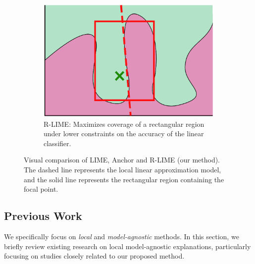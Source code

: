 \documentclass[runningheads]{llncs}
\begin{document}
{\begin{figure}[tbp]
\begin{subfigure}[t]{0.3\textwidth}
  \end{subfigure}
  \hspace{0.03\textwidth}
  \begin{subfigure}[t]{0.3\textwidth}
    \centering
    \includegraphics[width=\textwidth]{visual-rlime3}
    \caption{%
      R-LIME\@:
      Maximizes coverage of a rectangular region
      under lower constraints on the accuracy of the linear classifier.
    }\label{fig:rlime}
  \end{subfigure}
  \caption[Visual comparison of LIME, Anchor and R-LIME]{%
    Visual comparison of LIME, Anchor and R-LIME (our method).
    The dashed line represents the local linear approximation model,
    and the solid line represents the rectangular region containing the focal point.
  }
\end{figure}

\subsection{Previous Work}
We specifically focus on \emph{local} and \emph{model-agnostic} methods.
In this section,
we briefly review existing research on local model-agnostic explanations,
particularly focusing on studies closely related to our proposed method.

}
\end{document}
